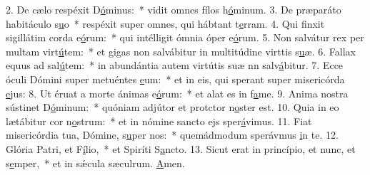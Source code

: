 2. De cælo respéxit D\uline{ó}minus:~* vidit omnes fílos h\uline{ó}minum.
3. De præparáto habitáculo s\uline{u}o~* respéxit super omnes, qui hábtant t\uline{e}rram.
4. Qui finxit sigillátim corda e\uline{ó}rum:~* qui intélligit ómnia óper e\uline{ó}rum.
5. Non salvátur rex per multam virt\uline{ú}tem:~* et gigas non salvábitur in multitúdine virttis s\uline{u}æ.
6. Fallax equus ad sal\uline{ú}tem:~* in abundántia autem virtútis suæ nn salv\uline{á}bitur.
7. Ecce óculi Dómini super metuéntes \uline{e}um:~* et in eis, qui sperant super misericórda \uline{e}jus:
8. Ut éruat a morte ánimas e\uline{ó}rum:~* et alat es in f\uline{a}me.
9. Anima nostra sústinet D\uline{ó}minum:~* quóniam adjútor et protctor n\uline{o}ster est.
10. Quia in eo lætábitur cor n\uline{o}strum:~* et in nómine sancto ejs sper\uline{á}vimus.
11. Fiat misericórdia tua, Dómine, s\uline{u}per nos:~* quemádmodum sperávmus \uline{i}n te.
12. Glória Patri, et F\uline{í}lio,~* et Spiríti S\uline{a}ncto.
13. Sicut erat in princípio, et nunc, et s\uline{e}mper,~* et in sǽcula sæculrum. \uline{A}men.
